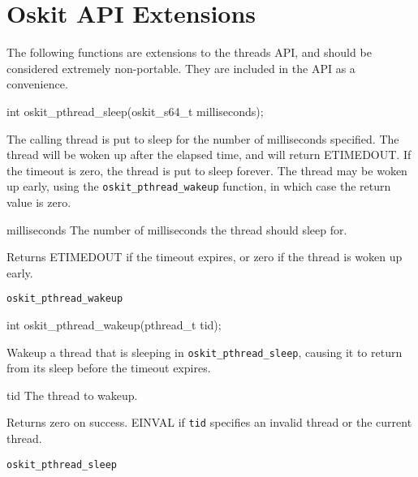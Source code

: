 \section{Oskit API Extensions}

The following functions are extensions to the \posix{} threads API, and
should be considered extremely non-portable. They are included in the
API as a convenience.

\begin{apisyn}

	\funcproto int oskit_pthread_sleep(oskit_s64_t milliseconds);
\end{apisyn}
\begin{apidesc}
	The calling thread is put to sleep for the number of milliseconds
	specified. The thread will be woken up after the elapsed time, and
	will return ETIMEDOUT\@. If the timeout is zero, the thread is put to
	sleep forever. The thread may be woken up early, using the
	\texttt{oskit_pthread_wakeup} function, in which case the return
	value is zero.
\end{apidesc}
\begin{apiparm}
	\item[milliseconds]
		The number of milliseconds the thread should sleep for.
\end{apiparm}
\begin{apiret}
	Returns ETIMEDOUT if the timeout expires, or zero if the thread is
	woken up early.
\end{apiret}
\begin{apirel}
	{\tt oskit_pthread_wakeup}
\end{apirel}

\begin{apisyn}

	\funcproto int oskit_pthread_wakeup(pthread_t tid);
\end{apisyn}
\begin{apidesc}
	Wakeup a thread that is sleeping in \texttt{oskit_pthread_sleep},
	causing it to return from its sleep before the timeout expires.
\end{apidesc}
\begin{apiparm}
	\item[tid]
		The thread to wakeup.
\end{apiparm}
\begin{apiret}
	Returns zero on success. EINVAL if {\tt tid} specifies an invalid
	thread or the current thread.
\end{apiret}
\begin{apirel}
	{\tt oskit_pthread_sleep}
\end{apirel}


